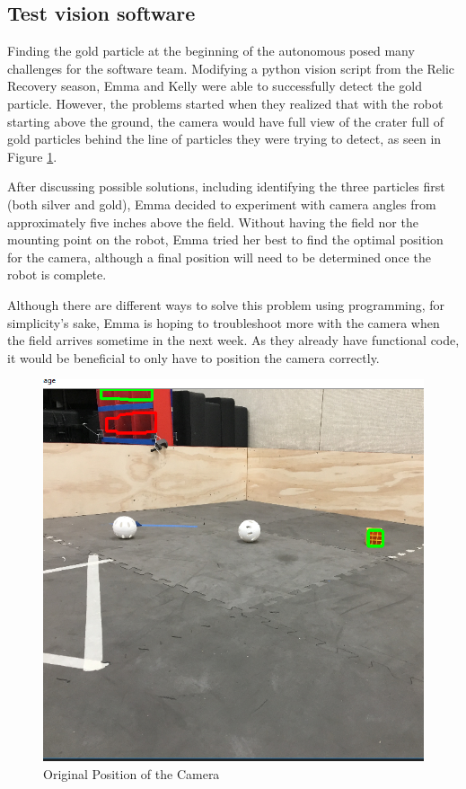\documentclass{article}
\newif\ifcontents
\begin{document}
\contentsfalse

\subsection{Test vision software}
Finding the gold particle at the beginning of the autonomous posed many challenges for the software team. Modifying a python vision script from the Relic Recovery season, Emma and Kelly were able to successfully detect the gold particle. However, the problems started when they realized that with the robot starting above the ground, the camera would have full view of the crater full of gold particles behind the line of particles they were trying to detect, as seen in
Figure \ref{fig:camera}.

After discussing possible solutions, including identifying the three particles first (both silver and gold), Emma decided to experiment with camera angles from approximately five inches above the field. Without having the field nor the mounting point on the robot, Emma tried her best to find the optimal position for the camera, although a final position will need to be determined once the robot is complete. 

Although there are different ways to solve this problem using programming, for simplicity's sake, Emma is hoping to troubleshoot more with the camera when the field arrives sometime in the next week. As they already have functional code, it would be beneficial to only have to position the camera correctly. 

\begin{figure}
    \centering
    \includegraphics[width=.6\textwidth]{02_09-10/images/originalcameraposition.png}
    \caption{Original Position of the Camera}
    \label{fig:camera}
\end{figure}
\end{document}
